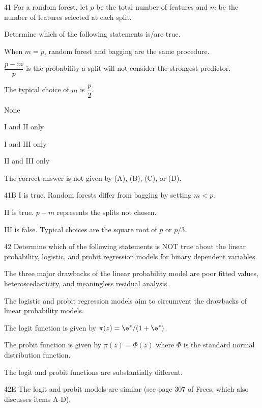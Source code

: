 \begin{question}{41}
For a random forest, let $p$ be the total number of features and $m$ be the number of features selected at each split.

Determine which of the following statements is/are true.
\begin{statements}
\item When $m = p$, random forest and bagging are the same procedure.
\item $\dfrac{p-m}{p}$ is the probability a split will not consider the strongest predictor.
\item The typical choice of $m$ is $\dfrac{p}{2}$.
\end{statements}

\begin{choices}
\item None
\item I and II only
\item I and III only
\item II and III only
\item The correct answer is not given by (A), (B), (C), or (D).
\end{choices}
\end{question}
\begin{solution}{41}{B}
I is true. Random forests differ from bagging by setting $m < p$.

II is true. $p - m$ represents the splits not chosen.

III is false. Typical choices are the square root of $p$ or $p/3$.
\end{solution}

\begin{question}{42}
Determine which of the following statements is NOT true about the linear probability, logistic, and probit regression models for binary dependent variables.

\begin{choices}
\item The three major drawbacks of the linear probability model are poor fitted values, heteroscedasticity, and meaningless residual analysis.
\item The logistic and probit regression models aim to circumvent the drawbacks of linear probability models.
\item The logit function is given by $\pi(z) = \e^z / (1 + \e^z)$.
\item The probit function is given by $\pi(z) = \Phi(z)$ where $\Phi$ is the standard normal distribution function.
\item The logit and probit functions are substantially different.
\end{choices}
\end{question}
\begin{solution}{42}{E}
The logit and probit models are similar (see page 307 of Frees, which also discusses items A-D).
\end{solution}

